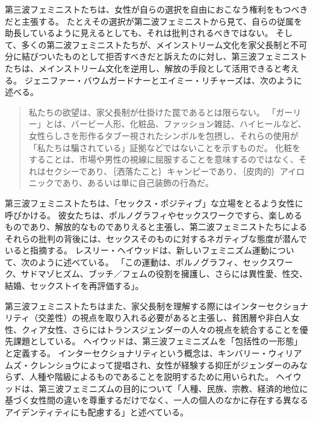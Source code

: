 \documentclass[paper=a4,book,openany]{jlreq}
\begin{document}
第三波フェミニストたちは、女性が自らの選択を自由におこなう権利をもつべきだと主張する。
たとえその選択が第二波フェミニストから見て、自らの従属を助長しているように見えるとしても、それは批判されるべきではない。
そして、多くの第二波フェミニストたちが、メインストリーム文化を家父長制と不可分に結びついたものとして拒否すべきだと訴えたのに対し、第三波フェミニストたちは、メインストリーム文化を逆用し、解放の手段として活用できると考える。
ジェニファー・バウムガードナーとエイミー・リチャーズは、次のように述べる。

\begin{quote}
  私たちの欲望は、家父長制が仕掛けた罠であるとは限らない。
「ガーリー」とは、バービー人形、化粧品、ファッション雑誌、ハイヒールなど、女性らしさを形作るタブー視されたシンボルを包摂し、それらの使用が「私たちは騙されている」証拠などではないことを示すものだ。
化粧をすることは、市場や男性の視線に屈服することを意味するのではなく、それはセクシーであり、｛洒落たこと｝{キャンピー}であり、｛皮肉的｝{アイロニック}であり、あるいは単に自己装飾の行為だ。
\citep[pp.302--303]{baumgardner06:_manif}

\end{quote}

第三波フェミニストたちは、「セックス・ポジティブ」な立場をとるよう女性に呼びかける。
彼女たちは、ポルノグラフィやセックスワークですら、楽しめるものであり、解放的なものでありえると主張し、第二波フェミニストたちによるそれらの批判の背後には、セックスそのものに対するネガティブな態度が潜んでいると指摘する。
レスリー・ヘイウッドは、新しいフェミニズム運動について、次のように述べている。
「この運動は、ポルノグラフィ、セックスワーク、サドマゾヒズム、ブッチ／フェムの役割を擁護し、さらには異性愛、性交、結婚、セックストイを再評価する」\citep[vol.1, p.260]{heywood06:_women_movem_today}。

第三波フェミニストたちはまた、家父長制を理解する際にはインターセクショナリティ（交差性）の視点を取り入れる必要があると主張し、貧困層や非白人女性、クィア女性、さらにはトランスジェンダーの人々の視点を統合することを優先課題としている。
ヘイウッドは、第三波フェミニズムを「包括性の一形態」と定義する\citep[vol.1, p.xx]{heywood06:_women_movem_today}。
インターセクショナリティという概念は、キンバリー・ウィリアムズ・クレンショウによって提唱され、女性が経験する抑圧がジェンダーのみならず、人種や階級によるものであることを説明するために用いられた\citep{crenshaw89:_demar_inter_race_sex}。
ヘイウッドは、第三波フェミニズムの目的について「人種、民族、宗教、経済的地位に基づく女性間の違いを尊重するだけでなく、一人の個人のなかに存在する異なるアイデンティティにも配慮する」と述べている\citep[vol. 1, p.xx]{heywood06:_women_movem_today}。
\end{document}
